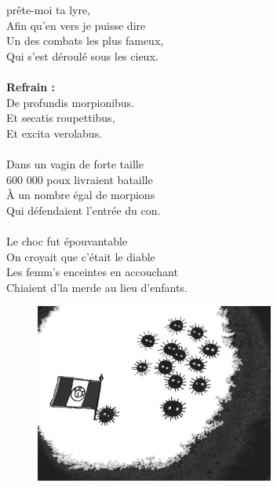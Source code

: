 \vspace{-0.7cm}
 prête-moi ta lyre,
\\Afin qu'en vers je puisse dire
\\Un des combats les plus fameux,
\\Qui s'est déroulé sous les cieux.
\\\\\textbf{Refrain :}
\\De profundis morpionibus.
\\Et secatis roupettibus,
\\Et excita verolabus.
\\\\Dans un vagin de forte taille
\\600 000 poux livraient bataille
\\À un nombre égal de morpions
\\Qui défendaient l'entrée du con.
\\\\Le choc fut épouvantable
\\On croyait que c'était le diable
\\Les femm's enceintes en accouchant
\\Chiaient d'la merde au lieu d'enfants.
\bigskip
\begin{figure}[h!]
\centering
   \includegraphics[width=0.7\textwidth]{images/de_profundis_morpionibus.jpg}
 \end{figure}
\breakpage
